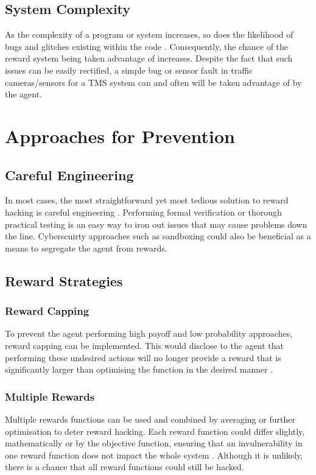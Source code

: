 \subsection{System Complexity}
As the complexity of a program or system increases, so does the likelihood of bugs and glitches existing within the code \cite{Amodei}.
Consequently, the chance of the reward system being taken advantage of increases. 
Despite the fact that such issues can be easily rectified, a simple bug or sensor fault in traffic cameras/sensors  for a TMS system can and often will be taken advantage of by the agent. 


\section{Approaches for Prevention}
\subsection{Careful Engineering}
In most cases, the most straightforward yet most tedious solution to reward hacking is careful engineering \cite{Amodei}.
Performing formal verification or thorough practical testing is an easy way to iron out issues that may cause problems down the line.
Cyberscuirty approaches such as sandboxing could also be beneficial as a means to segregate the agent from rewards.

\subsection{Reward Strategies}

\subsubsection{Reward Capping}
To prevent the agent performing high payoff and low probability approaches, reward capping can be implemented.
This would disclose to the agent that performing these undesired actions will no longer provide a reward that is significantly larger than optimising the function in the desired manner \cite{Amodei}.

\subsubsection{Multiple Rewards}
Multiple rewards functions can be used and combined by averaging or further optimisation to deter reward hacking.
Each reward function could differ slightly, mathematically or by the objective function, ensuring that an invulnerability in one reward function does not impact the whole system \cite{Amodei}.
Although it is unlikely, there is a chance that all reward functions could still be hacked.

